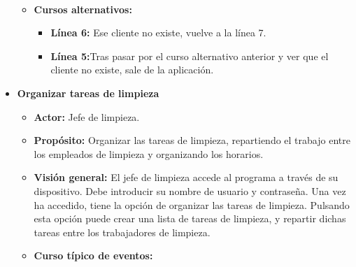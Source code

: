 \documentclass[spanish,a4paper,12pt]{report}		%
\begin{document}
\begin{itemize}
\begin{itemize}
\begin{tabular}{|p{6cm}||p{6cm}|}
			\end{tabular}
			\\
			\item \textbf{Cursos alternativos:} 
			\begin{itemize}
			\item  \textbf{Línea 6:} Ese cliente no existe, vuelve a la línea 7.
			\item  \textbf{Línea 5:}Tras pasar por el curso alternativo anterior y ver que el cliente no existe, sale de la aplicación.
			\end {itemize}
		\end{itemize}%



	\newpage	
	\hspace{0.6 true cm}
	\item \textbf{Organizar tareas de limpieza}				%
			\begin{itemize}
			\item \textbf{Actor: }Jefe de limpieza.
			\item \textbf{Propósito: }Organizar las tareas de limpieza, repartiendo el trabajo entre los empleados de limpieza y organizando los horarios. 		
			\item \textbf{Visión general: }El jefe de limpieza accede al programa a través de su dispositivo. Debe introducir su nombre de usuario y contraseña. Una vez ha accedido, tiene la opción de organizar las tareas de limpieza. Pulsando esta opción puede crear una lista de tareas de limpieza, y repartir dichas tareas entre los trabajadores de limpieza. 
			\item \textbf{Curso típico de eventos:} \\	%

\end{itemize}
\end{itemize}
\end{document}
